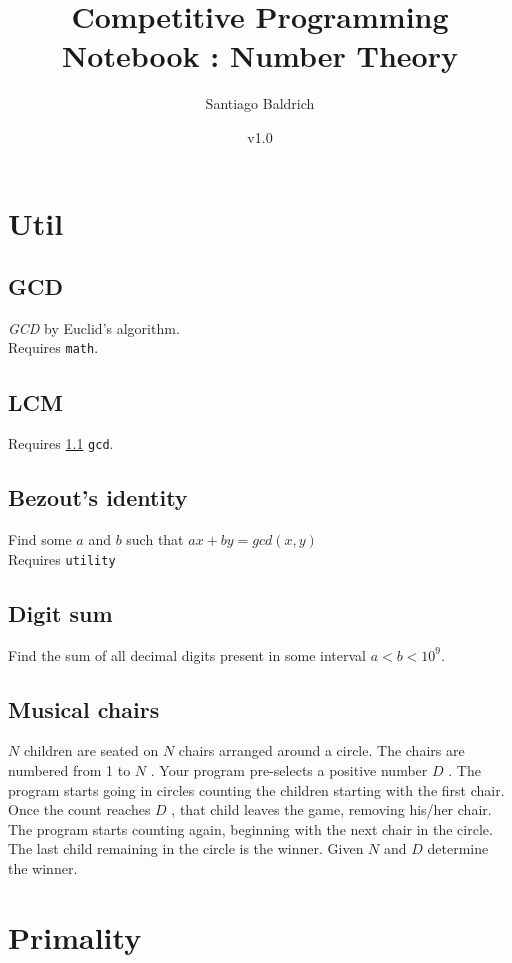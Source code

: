 \documentclass[11pt, oneside]{article}   	%
\title{Competitive Programming Notebook : Number Theory}
\author{Santiago Baldrich}
\date{v1.0}
\begin{document}
\tableofcontents
\newpage


\section{Util}
\subsection{GCD}\label{util:gcd}
\textit{GCD} by Euclid's algorithm.\\
Requires \verb|math|.
\subsection{LCM}
Requires \ref{util:gcd} \verb|gcd|.
\subsection{Bezout's identity}\label{util:bezout}
Find some $a$ and $b$ such that $ax  + by = gcd(x,y)$\\
Requires \verb|utility|
\subsection{Digit sum}	
Find the sum of all decimal digits present in some interval $a < b < 10^9$.
\subsection{Musical chairs}
$N$ children are seated on $N$ chairs arranged around a circle. The chairs are numbered from 1 to $N$ . Your program pre-selects a positive number $D$ . The program starts going in circles counting the children starting with the first chair. Once the count reaches $D$ , that child leaves the game, removing his/her chair. The program starts counting again, beginning with the next chair in the circle. The last child remaining in the circle is the winner. Given $N$ and $D$ determine the winner.




\section{Primality}
\end{document}
